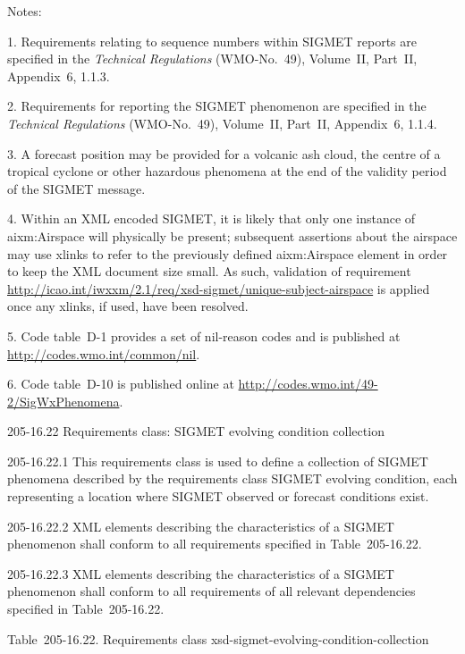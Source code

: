Notes:

1. Requirements relating to sequence numbers within SIGMET reports are specified in the \emph{Technical Regulations} (WMO-No.~49), Volume~II, Part~II, Appendix~6, 1.1.3.

2. Requirements for reporting the SIGMET phenomenon are specified in the \emph{Technical Regulations} (WMO-No.~49), Volume~II, Part~II, Appendix~6, 1.1.4.

3. A forecast position may be provided for a volcanic ash cloud, the centre of a tropical cyclone or other hazardous phenomena at the end of the validity period of the SIGMET message.

4. Within an XML encoded SIGMET, it is likely that only one instance of aixm:Airspace will physically be present; subsequent assertions about the airspace may use xlinks to refer to the previously defined aixm:Airspace element in order to keep the XML document size small. As such, validation of requirement \url{http://icao.int/iwxxm/2.1/req/xsd-sigmet/unique-subject-airspace} is applied once any xlinks, if used, have been resolved.

5. Code table~D-1 provides a set of nil-reason codes and is published at \url{http://codes.wmo.int/common/nil}.

6. Code table~D-10 is published online at \url{http://codes.wmo.int/49-2/SigWxPhenomena}.

205-16.22 Requirements class: SIGMET evolving condition collection

205-16.22.1 This requirements class is used to define a collection of SIGMET phenomena described by the requirements class SIGMET evolving condition, each representing a location where SIGMET observed or forecast conditions exist.

205-16.22.2 XML elements describing the characteristics of a SIGMET phenomenon shall conform to all requirements specified in Table~205-16.22.

205-16.22.3 XML elements describing the characteristics of a SIGMET phenomenon shall conform to all requirements of all relevant dependencies specified in Table~205-16.22.

Table~205-16.22. Requirements class xsd-sigmet-evolving-condition-collection

